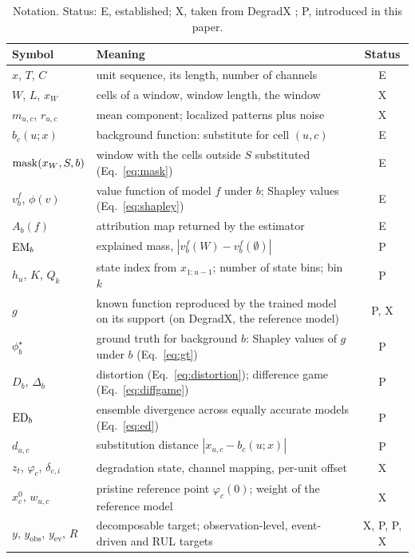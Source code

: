 \documentclass{article}
\begin{document}
\begin{table}[t]
\caption{Notation. Status: E, established; X, taken from DegradX \citep{degradx2026}; P, introduced in this paper.}
\label{tab:notation}
\centering
\small
\begin{tabularx}{\linewidth}{@{}l>{\raggedright\arraybackslash}Xc@{}}
\toprule
Symbol & Meaning & Status \\
\midrule
$x$, $T$, $C$ & unit sequence, its length, number of channels & E \\
$W$, $L$, $x_W$ & cells of a window, window length, the window & X \\
$m_{u,c}$, $r_{u,c}$ & mean component; localized patterns plus noise & X \\
$b_c(u;x)$ & background function: substitute for cell $(u,c)$ & E \\
$\operatorname{mask}(x_W,S,b)$ & window with the cells outside $S$ substituted (Eq.~\ref{eq:mask}) & E \\
$v^f_b$, $\phi(v)$ & value function of model $f$ under $b$; Shapley values (Eq.~\ref{eq:shapley}) & E \\
$A_b(f)$ & attribution map returned by the estimator & E \\
$\mathrm{EM}_b$ & explained mass, $|v^f_b(W)-v^f_b(\emptyset)|$ & P \\
$h_u$, $K$, $Q_k$ & state index from $x_{1:u-1}$; number of state bins; bin $k$ & P \\
$g$ & known function reproduced by the trained model on its support (on DegradX, the reference model) & P, X \\
$\phi^\star_b$ & ground truth for background $b$: Shapley values of $g$ under $b$ (Eq.~\ref{eq:gt}) & P \\
$D_b$, $\Delta_b$ & distortion (Eq.~\ref{eq:distortion}); difference game (Eq.~\ref{eq:diffgame}) & P \\
$\mathrm{ED}_b$ & ensemble divergence across equally accurate models (Eq.~\ref{eq:ed}) & P \\
$d_{u,c}$ & substitution distance $|x_{u,c}-b_c(u;x)|$ & P \\
$z_t$, $\varphi_c$, $\delta_{c,i}$ & degradation state, channel mapping, per-unit offset & X \\
$x^0_c$, $w_{u,c}$ & pristine reference point $\varphi_c(0)$; weight of the reference model & X \\
$y$, $y_{\mathrm{obs}}$, $y_{\mathrm{ev}}$, $R$ & decomposable target; observation-level, event-driven and RUL targets & X, P, P, X \\
\bottomrule
\end{tabularx}
\end{table}
\end{document}
